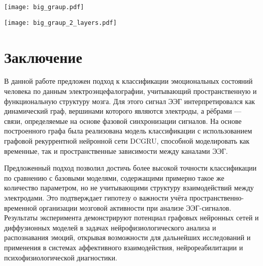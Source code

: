 \documentclass[12pt, twoside]{article}
\begin{document}
\begin{center}
\texttt{[image: big\_graup.pdf]}
\end{center}

\begin{center}
\texttt{[image: big\_graup\_2\_layers.pdf]}
\end{center}

\section{Заключение}

В данной работе предложен подход к классификации эмоциональных состояний человека по данным электроэнцефалографии, учитывающий пространственную и функциональную структуру мозга. Для этого сигнал ЭЭГ интерпретировался как динамический граф, вершинами которого являются электроды, а рёбрами — связи, определяемые на основе фазовой синхронизации сигналов. На основе построенного графа была реализована модель классификации с использованием графовой рекуррентной нейронной сети DCGRU, способной моделировать как временные, так и пространственные зависимости между каналами ЭЭГ.

Предложенный подход позволил достичь более высокой точности классификации по сравнению с базовыми моделями, содержащими примерно такое же количество параметром, но не учитывающими структуру взаимодействий между электродами. Это подтверждает гипотезу о важности учёта пространственно-временной организации мозговой активности при анализе ЭЭГ-сигналов. Результаты эксперимента демонстрируют потенциал графовых нейронных сетей и диффузионных моделей в задачах нейрофизиологического анализа и распознавания эмоций, открывая возможности для дальнейших исследований и применения в системах аффективного взаимодействия, нейрореабилитации и психофизиологической диагностики.

\newpage



\end{document}
